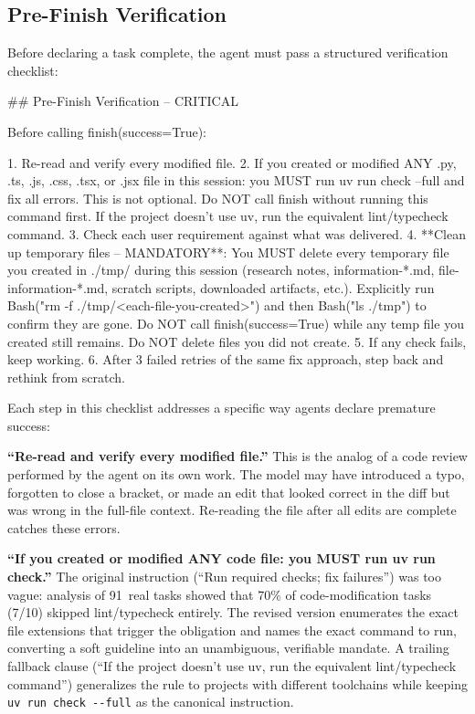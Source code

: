 \documentclass{article}
\begin{document}
\subsection{Pre-Finish Verification}

Before declaring a task complete, the agent must pass a structured verification checklist:

\begin{prompt}
## Pre-Finish Verification -- CRITICAL

Before calling finish(success=True):

1. Re-read and verify every modified file.
2. If you created or modified ANY .py, .ts, .js, .css,
   .tsx, or .jsx file in this session: you MUST run
   uv run check --full and fix all errors. This is not
   optional. Do NOT call finish without running this
   command first. If the project doesn't use uv, run
   the equivalent lint/typecheck command.
3. Check each user requirement against what was
   delivered.
4. **Clean up temporary files -- MANDATORY**: You MUST
   delete every temporary file you created in ./tmp/
   during this session (research notes, information-*.md,
   file-information-*.md, scratch scripts, downloaded
   artifacts, etc.).  Explicitly run Bash("rm -f
   ./tmp/<each-file-you-created>") and then
   Bash("ls ./tmp") to confirm they are gone. Do NOT
   call finish(success=True) while any temp file you
   created still remains. Do NOT delete files you did
   not create.
5. If any check fails, keep working.
6. After 3 failed retries of the same fix approach,
   step back and rethink from scratch.
\end{prompt}

\noindent Each step in this checklist addresses a specific way agents declare premature success:

\textbf{``Re-read and verify every modified file.''}  This is the analog of a code review performed by the agent on its own work.  The model may have introduced a typo, forgotten to close a bracket, or made an edit that looked correct in the diff but was wrong in the full-file context.  Re-reading the file after all edits are complete catches these errors.

\textbf{``If you created or modified ANY code file: you MUST run uv run check.''}  The original instruction (``Run required checks; fix failures'') was too vague: analysis of 91~real tasks showed that 70\% of code-modification tasks (7/10) skipped lint/typecheck entirely.  The revised version enumerates the exact file extensions that trigger the obligation and names the exact command to run, converting a soft guideline into an unambiguous, verifiable mandate.  A trailing fallback clause (``If the project doesn't use uv, run the equivalent lint/typecheck command'') generalizes the rule to projects with different toolchains while keeping \texttt{uv run check -{}-full} as the canonical instruction.
\end{document}
